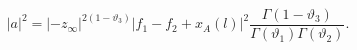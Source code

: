 \begin{equation}
\label{a}
|a|^{2}=|-z_{\infty}|^{2(1-\vartheta_{3})}|f_{1}-f_{2}+x_{A}(l)|^{2}\frac{\Gamma(1-\vartheta_{3})}{\Gamma(\vartheta_{1})\Gamma(\vartheta_{2})}.
\end{equation}

